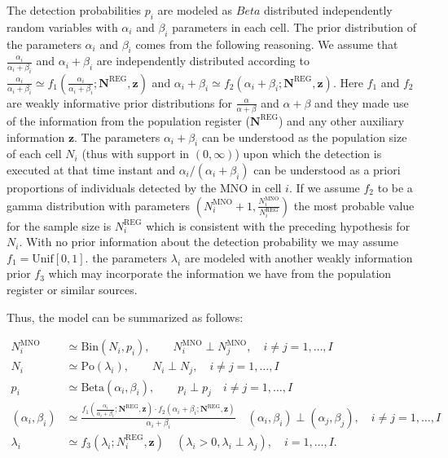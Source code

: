 \documentclass[12pt, a4paper]{article}
\begin{document}
The detection probabilities $p_{i}$ are modeled as $Beta$ distributed independently 
random variables with $\alpha_{i}$ and $\beta_{i}$ parameters in each cell. The prior 
distribution of the parameters $\alpha_{i}$ and $\beta_{i}$ comes from the following reasoning.
We assume that $\frac{\alpha_{i}}{\alpha_{i} + \beta_{i}}$ 
and $\alpha_{i} + \beta_{i}$ are independently distributed according 
to $\frac{\alpha_{i}}{\alpha_{i} + \beta_{i}}\simeq f_{1}(\frac{\alpha_{i}}{\alpha_{i}+\beta_{i}}; \mathbf{N}^{\textrm{REG}}, \mathbf{z})$   
and $\alpha_{i} + \beta_{i}\simeq f_{2}(\alpha_{i}+\beta_{i}; \mathbf{N}^{\textrm{REG}}, \mathbf{z})$.
Here  $f_{1}$ and $f_{2}$ are weakly informative prior distributions for $\frac{\alpha}{\alpha + \beta}$
and $\alpha + \beta$ and they made use of the information from the population 
register ($\mathbf{N}^{\textrm{REG}}$) and any other auxiliary information $\mathbf{z}$. 
The parameters $\alpha_{i}+\beta_{i}$ can be understood as the population size of 
each cell $N_{i}$ (thus with support in $(0,\infty)$) upon which the detection is executed 
at that time instant and $\alpha_{i}/(\alpha_{i}+\beta_{i})$ can be understood as a priori proportions 
of individuals detected by the MNO in cell $i$. 
If we assume $f_{2}$ to be a gamma distribution with parameters 
$(N_{i}^{\textrm{MNO}} + 1, \frac{N_{i}^{\textrm{MNO}}}{N_{i}^{\textrm{REG}}})$  the most probable 
value for the sample size is $N_{i}^{\textrm{REG}}$ which is consistent with the preceding hypothesis for $N_{i}$.
With no prior information about the detection probability we may assume $f_{1}=\textrm{Unif}[0,1]$.
the parameters $\lambda_{i}$ are modeled with another weakly information prior $f_{3}$ which may incorporate 
the information we have from the population register or similar sources.

Thus, the model can be summarized as follows:

\begin{align}
N_{i}^{\textrm{MNO}}&\simeq\textrm{Bin}\left(N_{i}, p_{i}\right),\qquad N_{i}^{\textrm{MNO}}\perp N_{j}^{\textrm{MNO}},\quad i\neq j=1,\dots,I\\
N_{i}&\simeq\textrm{Po}\left(\lambda_{i}\right),\qquad N_{i}\perp N_{j},\quad i\neq j=1,\dots,I\nonumber\\
p_{i}&\simeq\textrm{Beta}\left(\alpha_{i},\beta_{i}\right),\qquad p_{i}\perp p_{j}\quad i\neq j=1,\dots,I\nonumber\\
\left(\alpha_{i}, \beta_{i}\right)&\simeq \frac{f_{1}(\frac{\alpha_{i}}{\alpha_{i}+\beta_{i}}; \mathbf{N}^{\textrm{REG}}, \mathbf{z})\cdot f_{2}(\alpha_{i}+\beta_{i}; \mathbf{N}^{\textrm{REG}}, \mathbf{z})}{\alpha_{i}+\beta_{i}}\quad
(\alpha_{i},\beta_{i})\perp(\alpha_{j},\beta_{j}),\quad i\neq j=1,\dots,I\nonumber\\
\lambda_{i}&\simeq f_{3}(\lambda_{i}; N_{i}^{\textrm{REG}}, \mathbf{z})\quad (\lambda_{i} > 0, \lambda_{i}\perp\lambda_{j}), \quad i=1,\dots,I.\nonumber
\end{align}
\end{document}
